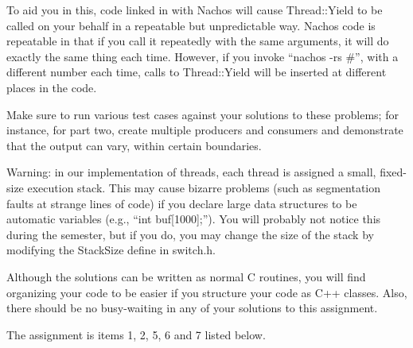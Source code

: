To aid you in this, code linked in with Nachos will cause Thread::Yield 
to be called on your behalf in a repeatable but unpredictable way.
Nachos code is repeatable in that if you call it repeatedly with the 
same arguments, it will do exactly the same thing each time.
However, if you invoke ``nachos -rs \#'', with a different number each
time, calls to Thread::Yield will be inserted at different places in the code.

Make sure to run various test cases against your solutions to 
these problems; for instance, for part two, create multiple producers
and consumers and demonstrate that the output can vary, within certain 
boundaries.

Warning: in our implementation of threads, each thread is assigned a 
small, fixed-size execution stack.  This may cause bizarre problems 
(such as segmentation faults at strange lines of code) if you declare 
large data structures to be automatic variables (e.g., ``int buf[1000];'').
You will probably not notice this during the semester, but if you do,
you may change the size of the stack by modifying the StackSize define in 
switch.h.

Although the solutions can be written as normal C routines, you will 
find organizing your code to be easier if you structure your code
as C++ classes.  Also, there should be no busy-waiting in any of your 
solutions to this assignment.  

The assignment is items 1, 2, 5, 6 and 7 listed below.

